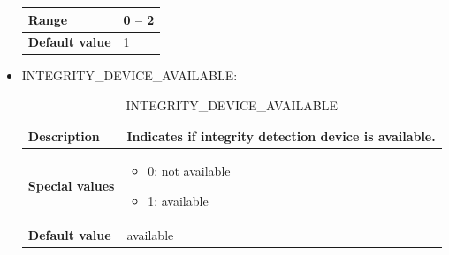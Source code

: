 \documentclass{template/openetcs}
\begin{document}
\begin{itemize}
\begin{longtable}{|l|l|}
					\begin{minipage}[t]{0.22\linewidth} \textbf{Range}	\end{minipage} 
				&	\begin{minipage}[t]{0.78\linewidth} 0 – 2 \end{minipage} \\
				
				\hline
				
					\begin{minipage}[t]{0.22\linewidth} \textbf{Default value}	\end{minipage} 
				&	\begin{minipage}[t]{0.78\linewidth} 1 \end{minipage} \\
				
				\hline
				
			\end{longtable}
			
		\item INTEGRITY\_DEVICE\_AVAILABLE:
						
			\begin{longtable}{|l|l|}
				\caption{INTEGRITY\_DEVICE\_AVAILABLE}\\ 
				\hline
				
					\begin{minipage}[t]{0.22\linewidth} \textbf{Description}	\end{minipage} 
				&	\begin{minipage}[t]{0.78\linewidth} Indicates if integrity detection device is available. \end{minipage} \\
				
				\hline
																																									
					\begin{minipage}[t]{0.22\linewidth} \textbf{Special values}	\end{minipage} 
				&	\begin{minipage}[t]{0.78\linewidth} \begin{itemize} \item 0: not available \item 1: available \end{itemize} \end{minipage} \\
				
				\hline
				
					\begin{minipage}[t]{0.22\linewidth} \textbf{Default value}	\end{minipage} 
				&	\begin{minipage}[t]{0.78\linewidth} available \end{minipage} \\
				

\end{longtable}
\end{itemize}
\end{document}
